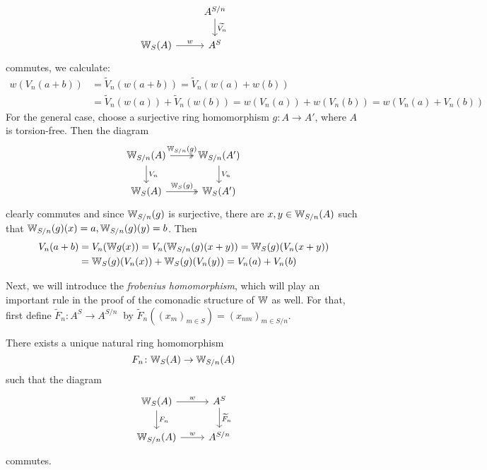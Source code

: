 \begin{bigproof}
\[\begin{tikzcd}
            & A^{S/n} \arrow[d,"\widetilde{V_n}"]\\
            \W_S(A) \arrow[r,"w"]
            & A^S
        \end{tikzcd}
    \]
    commutes, we calculate:
    \begin{align*}
        w(V_n(a+b)) &= \widetilde{V}_n(w(a+b))= \widetilde{V}_n(w(a)+w(b)) \\
        &= \widetilde{V}_n(w(a))+\widetilde{V}_n(w(b))
        = w(V_n(a))+w(V_n(b))= w(V_n(a)+V_n(b))
    \end{align*}
    For the general case, choose a surjective ring homomorphism $g \colon A \to A'$,
    where $A$ is torsion-free. Then the diagram
    \[
       \begin{tikzcd}
           \W_{S/n}(A) \arrow[r,"\W_{S/n}(g)",twoheadrightarrow] \arrow[d,"V_n"] 
             & \W_{S/n}(A') \arrow[d,"V_n"] \\
           \W_S(A) \arrow[r,"\W_S(g)",twoheadrightarrow]
             & \W_S(A')
       \end{tikzcd} 
    \]
    clearly commutes and since $\mathbb{W}_{S/n}(g)$ is surjective, there are $x,y \in \mathbb{W}_{S/n}(A)$
    such that $\mathbb{W}_{S/n}(g)(x)=a, \mathbb{W}_{S/n}(g)(y)=b$.
    Then 
    \begin{align*}
        V_n(a+b) &= V_n(\mathbb{W} g(x))= V_n(\mathbb{W}_{S/n}(g)(x+y))=\mathbb{W}_S(g)(V_n(x+y)) \\
        &= \mathbb{W}_S(g)(V_n(x)) + \mathbb{W}_S(g)(V_n(y)) = V_n(a)+V_n(b)
    \end{align*}
\end{bigproof}
Next, we will introduce the \textit{frobenius homomorphism}, which will play 
an important rule in the proof of the comonadic structure of $\mathbb{W}$ as well.
For that, first define $\widetilde{F}_n \colon A^S \to A^{S/n} \ $
by $\widetilde{F}_n((x_m)_{m \in S}) = (x_{nm})_{m \in S/n}$.
\begin{lemma} \label{lem: frobenius}
    There exists a unique natural ring homomorphism
    \[
      F_n \colon \mathbb{W}_S(A) \to \mathbb{W}_{S/n}(A)  
    \]
    such that the diagram 
    \[
        \begin{tikzcd}
            \W_S(A) \arrow[r,"w"] \arrow[d,"F_n"] 
              & A^S \arrow[d,"\widetilde{F}_n"] \\
            \W_{S/n}(A) \arrow[r,"w"]
              & A^{S/n}
        \end{tikzcd}        
    \]
    commutes.
\end{lemma}

